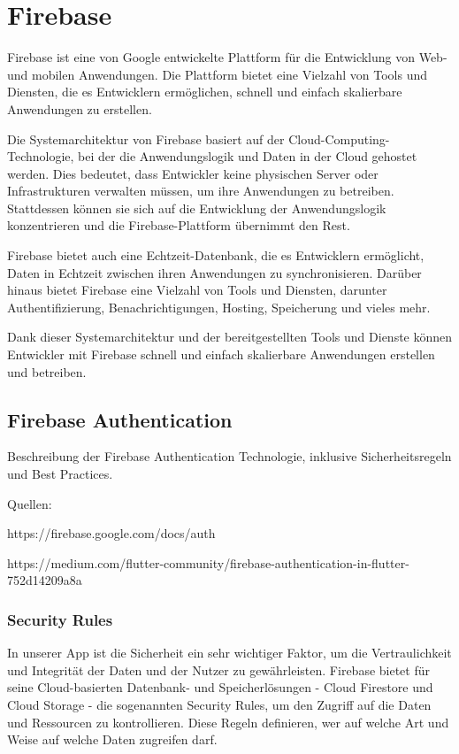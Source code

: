 \section{Firebase}
Firebase\cite{firebase} ist eine von Google entwickelte Plattform für die Entwicklung von Web- und mobilen Anwendungen. Die Plattform bietet eine Vielzahl von Tools und Diensten, die es Entwicklern ermöglichen, schnell und einfach skalierbare Anwendungen zu erstellen.

Die Systemarchitektur von Firebase basiert auf der Cloud-Computing-Technologie, bei der die Anwendungslogik und Daten in der Cloud gehostet werden. Dies bedeutet, dass Entwickler keine physischen Server oder Infrastrukturen verwalten müssen, um ihre Anwendungen zu betreiben. Stattdessen können sie sich auf die Entwicklung der Anwendungslogik konzentrieren und die Firebase-Plattform übernimmt den Rest.

Firebase bietet auch eine Echtzeit-Datenbank, die es Entwicklern ermöglicht, Daten in Echtzeit zwischen ihren Anwendungen zu synchronisieren. Darüber hinaus bietet Firebase eine Vielzahl von Tools und Diensten, darunter Authentifizierung, Benachrichtigungen, Hosting, Speicherung und vieles mehr.

Dank dieser Systemarchitektur und der bereitgestellten Tools und Dienste können Entwickler mit Firebase schnell und einfach skalierbare Anwendungen erstellen und betreiben.

\subsection{Firebase Authentication}

Beschreibung der Firebase Authentication Technologie, inklusive Sicherheitsregeln und Best Practices.

Quellen:

https://firebase.google.com/docs/auth

https://medium.com/flutter-community/firebase-authentication-in-flutter-752d14209a8a

\subsubsection{Security Rules}
In unserer App ist die Sicherheit ein sehr wichtiger Faktor,
um die Vertraulichkeit und Integrität der Daten und der
Nutzer zu gewährleisten. Firebase bietet für seine
Cloud-basierten Datenbank- und Speicherlösungen - Cloud
Firestore und Cloud Storage - die sogenannten Security
Rules\cite{firebase-rules-docs}\cite{firestore-rules-firestore-nochba}\cite{storage-rules-storage-nochba}, um den Zugriff auf
die Daten und Ressourcen zu kontrollieren. Diese Regeln
definieren, wer auf welche Art und Weise auf welche Daten
zugreifen darf.

